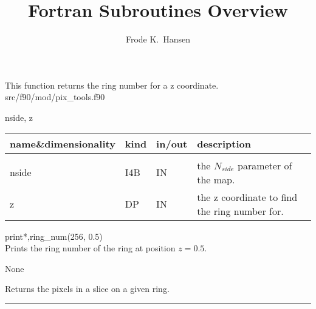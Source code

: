 

\sloppy

\title{\healpix Fortran Subroutines Overview}
 \section[ring\_num]{ }
\label{sub:ring_num}
\author{Frode K.~Hansen}


\begin{facility}
{This function returns the ring number for a z coordinate.}
{src/f90/mod/pix\_tools.f90}
\end{facility}

\begin{f90function}
{nside, z}
\end{f90function}

\begin{arguments}
{
\begin{tabular}{p{0.4\hsize} p{0.05\hsize} p{0.1\hsize} p{0.35\hsize}} \hline  
\textbf{name\&dimensionality} & \textbf{kind} & \textbf{in/out} & \textbf{description} \\ \hline
                   &   &   &                           \\ %
nside & I4B & IN & the $N_{side}$ parameter of the map. \\
z & DP & IN & the z coordinate to find the ring number for. \\

\end{tabular}
}
\end{arguments}

\begin{example}
{
print*,ring\_num(256, 0.5)  \\
}
{
Prints the ring number of the ring at position $z=0.5$.
}
\end{example}

\begin{modules}
  \begin{sulist}{} %
 \item[None]	
  \end{sulist}
\end{modules}
\newpage
\begin{related}
  \begin{sulist}{} %
 \item[\htmlref{in\_ring}{sub:in_ring}] Returns the pixels in a slice on a given ring.
  \end{sulist}
\end{related}

\rule{\hsize}{2mm}

\newpage

